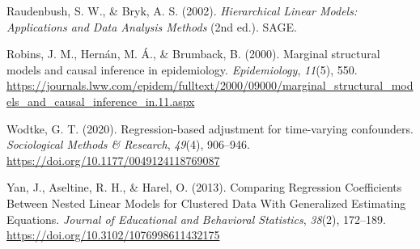 \documentclass[
  12pt,
  a4paper,
]{article}
\newlength{\cslhangindent}
\newenvironment{CSLReferences}[2] %
 {\begin{list}{}{%
  \setlength{\itemindent}{0pt}
  \setlength{\leftmargin}{0pt}
  \setlength{\parsep}{0pt}
  \ifodd #1
   \setlength{\leftmargin}{\cslhangindent}
   \setlength{\itemindent}{-1\cslhangindent}
  \fi
  \setlength{\itemsep}{#2\baselineskip}}}
 {\end{list}}
\begin{document}
\begin{CSLReferences}{1}{0}
Raudenbush, S. W., \& Bryk, A. S. (2002). \emph{Hierarchical Linear
Models: Applications and Data Analysis Methods} (2nd ed.). SAGE.

Robins, J. M., Hernán, M. Á., \& Brumback, B. (2000). Marginal
structural models and causal inference in epidemiology.
\emph{Epidemiology}, \emph{11}(5), 550.
\url{https://journals.lww.com/epidem/fulltext/2000/09000/marginal_structural_models_and_causal_inference_in.11.aspx}

Wodtke, G. T. (2020). Regression-based adjustment for time-varying
confounders. \emph{Sociological Methods \& Research}, \emph{49}(4),
906--946. \url{https://doi.org/10.1177/0049124118769087}

Yan, J., Aseltine, R. H., \& Harel, O. (2013). Comparing Regression
Coefficients Between Nested Linear Models for Clustered Data With
Generalized Estimating Equations. \emph{Journal of Educational and
Behavioral Statistics}, \emph{38}(2), 172--189.
\url{https://doi.org/10.3102/1076998611432175}

\end{CSLReferences}
\end{document}
